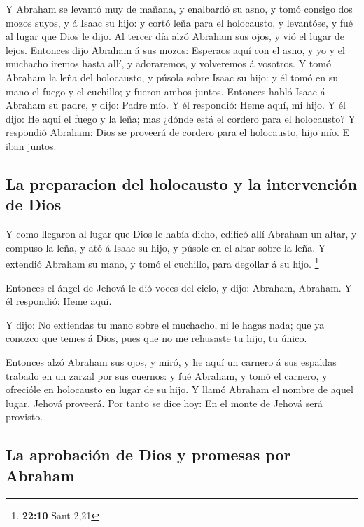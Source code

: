  Y Abraham se levantó muy de mañana, y enalbardó su asno,
y tomó consigo dos mozos suyos, y á Isaac su hijo: y cortó leña para el
holocausto, y levantóse, y fué al lugar que Dios le dijo. 
Al tercer día alzó Abraham sus ojos, y vió el lugar de lejos.
 Entonces dijo Abraham á sus mozos: Esperaos aquí con el
asno, y yo y el muchacho iremos hasta allí, y adoraremos, y volveremos á
vosotros.  Y tomó Abraham la leña del holocausto, y púsola
sobre Isaac su hijo: y él tomó en su mano el fuego y el cuchillo; y
fueron ambos juntos.  Entonces habló Isaac á Abraham su
padre, y dijo: Padre mío. Y él respondió: Heme aquí, mi hijo. Y él dijo:
He aquí el fuego y la leña; mas ¿dónde está el cordero para el
holocausto?  Y respondió Abraham: Dios se proveerá de
cordero para el holocausto, hijo mío. E iban juntos.

\hypertarget{la-preparacion-del-holocausto-y-la-intervenciuxf3n-de-dios}{%
\subsection{La preparacion del holocausto y la intervención de
Dios}\label{la-preparacion-del-holocausto-y-la-intervenciuxf3n-de-dios}}

 Y como llegaron al lugar que Dios le había dicho, edificó
allí Abraham un altar, y compuso la leña, y ató á Isaac su hijo, y
púsole en el altar sobre la leña.  Y extendió Abraham su
mano, y tomó el cuchillo, para degollar á su hijo. \footnote{\textbf{22:10}
  Sant 2,21}

 Entonces el ángel de Jehová le dió voces del cielo, y
dijo: Abraham, Abraham. Y él respondió: Heme aquí.

 Y dijo: No extiendas tu mano sobre el muchacho, ni le
hagas nada; que ya conozco que temes á Dios, pues que no me rehusaste tu
hijo, tu único.

 Entonces alzó Abraham sus ojos, y miró, y he aquí un
carnero á sus espaldas trabado en un zarzal por sus cuernos: y fué
Abraham, y tomó el carnero, y ofrecióle en holocausto en lugar de su
hijo.  Y llamó Abraham el nombre de aquel lugar, Jehová
proveerá. Por tanto se dice hoy: En el monte de Jehová será provisto.

\hypertarget{la-aprobaciuxf3n-de-dios-y-promesas-por-abraham}{%
\subsection{La aprobación de Dios y promesas por
Abraham}\label{la-aprobaciuxf3n-de-dios-y-promesas-por-abraham}}

